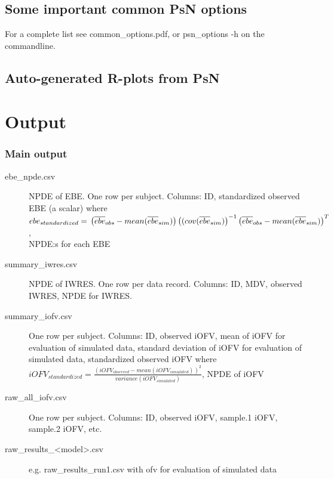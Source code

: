 \subsection{Some important common PsN options}
For a complete list see common\_options.pdf, 
or psn\_options -h on the commandline.


\subsection{Auto-generated R-plots from PsN}
\newcommand{\rplotsconditions}{The default simeval template 
requires that library PerformanceAnalytics is installed.
If the conditions are not fulfilled then no pdf will be generated,
see the .Rout file in the main run directory for error messages.}



\section{Output}

\subsubsection*{Main output}
\begin{description}
\item[ebe\_npde.csv] NPDE of EBE. One row per subject. Columns: ID,
standardized observed EBE (a scalar) where 
$ebe_{standardized}= \\
\left(\overline{ebe}_{obs} - mean (\overline{ebe}_{sim})\right)\left((cov(\overline{ebe}_{sim})\right)^{-1}
\left(\overline{ebe}_{obs} - mean (\overline{ebe}_{sim})\right)^T$,\\ 
NPDE:s for each EBE
\item[summary\_iwres.csv] NPDE of IWRES. One row per data record. Columns: ID, MDV, observed IWRES, NPDE for IWRES.
\item[summary\_iofv.csv] One row per subject. Columns: ID, observed iOFV,
mean of iOFV for evaluation of simulated data,
standard deviation of iOFV for evaluation of simulated data,
standardized observed iOFV where
$iOFV_{standardized}=\frac{(iOFV_{observed} - mean (iOFV_{simulated}))^2}{variance(iOFV_{simulated})}$, NPDE of iOFV
\item[raw\_all\_iofv.csv] One row per subject. Columns: ID, observed iOFV, sample.1 iOFV, sample.2 iOFV, etc. 
\item[raw\_results\_<model>.csv] e.g. raw\_results\_run1.csv with ofv for evaluation of simulated data
\end{description}

